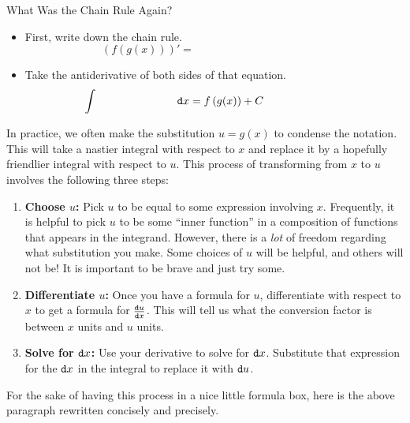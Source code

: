 \begin{exercise}{What Was the Chain Rule Again? \Coffeecup }
\begin{itemize}
\item First, write down the chain rule. $$\left(f\left(g(x)\right)\right)'= \hspace{2in} $$ 

\item Take the antiderivative of both sides of that equation.  $$\int \hspace{1in} \mathop{}\!\mathtt{d} x= f\left(g(x)\right)+C \hspace{1in} $$
\end{itemize}
\end{exercise}
%
In practice, we often make the substitution $u=g(x)$ to condense the notation.  This will take a nastier integral with respect to $x$ and replace it by a hopefully friendlier integral with respect to $u$.  This process of transforming from $x$ to $u$ involves the following three steps: 
%
\begin{enumerate}
\item {\bf Choose $u$:} Pick $u$ to be equal to some expression involving $x$. Frequently, it is helpful to pick $u$ to be some ``inner function'' in a composition of functions that appears in the integrand.  However, there is a \emph{lot} of freedom regarding what substitution you make.  Some choices of $u$ will be helpful, and others will not be!  It is important to be brave and just try some.
\item {\bf Differentiate $u$:} Once you have a formula for $u$, differentiate with respect to $x$ to get a formula for $\frac{\mathop{}\!\mathtt{d} u}{\mathop{}\!\mathtt{d} x}$.  This will tell us what the conversion factor is between $x$ units and $u$ units.
\item {\bf Solve for $\mathop{}\!\mathtt{d} x$:} Use your derivative to solve for $\mathop{}\!\mathtt{d} x$.  Substitute that expression for the $\mathop{}\!\mathtt{d} x$ in the integral to replace it with $\mathop{}\!\mathtt{d} u$.
\end{enumerate}

For the sake of having this process in a nice little formula box, here is the above paragraph rewritten concisely and precisely.

